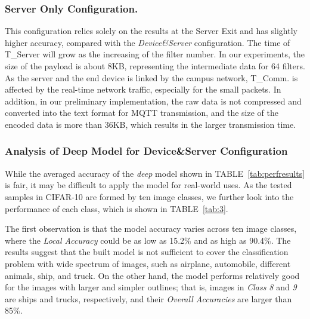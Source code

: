 \documentclass[format=acmsmall, review=false, screen=true]{acmart}
\def\tablename{TABLE}
\begin{document}
\subsubsection{Server Only Configuration.} This configuration relies solely on the results at the Server Exit and has slightly higher accuracy, compared with the \emph{Device\&Server} configuration.
The time of T\_Server will grow as the increasing of the filter number. In our experiments, the size of the payload is about 8KB, representing the intermediate data for 64 filters. As the server and the end device is linked by the campus network, T\_Comm. is affected by the real-time network traffic, especially for the small packets. In addition, in our preliminary implementation, the raw data is not compressed and converted into the text format for MQTT transmission, and the size of the encoded data is more than 36KB, which results in the larger transmission time.

\subsubsection{Analysis of Deep Model for Device\&Server Configuration}
While the averaged accuracy of the \emph{deep} model shown in \tablename~\ref{tab:perfresults} is fair, it may be difficult to apply the model for real-world uses. As the tested samples in CIFAR-10 are formed by ten image classes, we further look into the performance of each class, which is shown in \tablename~\ref{tab:3}.

The first observation is that the model accuracy varies across ten image classes, where the \emph{Local Accuracy} could be as low as 15.2\% and as high as 90.4\%. The results suggest that the built model is not sufficient to cover the classification problem with wide spectrum of images, such as airplane, automobile, different animals, ship, and truck. On the other hand, the model performs relatively good for the images with larger and simpler outlines; that is, images in \emph{Class 8} and \emph{9} are ships and trucks, respectively, and their \emph{Overall Accuracies} are larger than 85\%.
\end{document}
